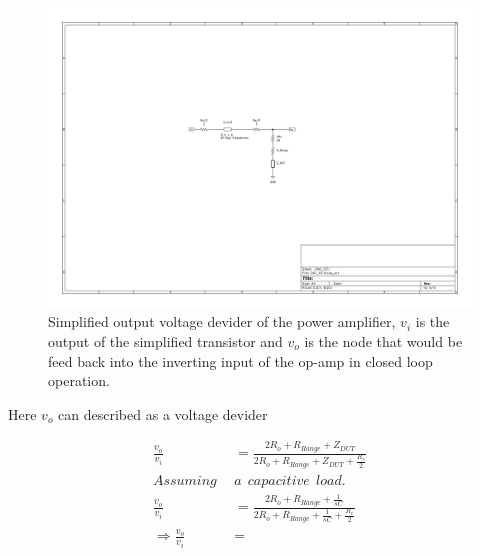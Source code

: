 \begin{figure}[H]
    \centering
    \includegraphics[clip, trim=260 240 280 220, width=1\textwidth]{Sections/7_SystemDesign/Figures/7_1_1_5_DAC_FILTER_DAC_PZ.pdf}
    \caption{Simplified output voltage devider of the power amplifier, $v_i$ is the output of the simplified transistor and $v_o$ is the node that would be feed back into the inverting input of the op-amp in closed loop operation.}
    \label{fig_7_1_1_5_DAC_PWR_AMP_PZ}
\end{figure}

Here $v_o$ can described as a voltage devider

\begin{equation}
\label{eq_DAC_PWR_1}
\begin{split}
    \frac{v_o}{v_i} &= \frac{2R_o+R_{Range}+Z_{DUT}}{2R_o+R_{Range}+Z_{DUT}+\frac{R_e}{2}} \\
    Assuming \:\: &a \:\: capacitive \:\: load. \\
    \frac{v_o}{v_i} &= \frac{2R_o+R_{Range}+\frac{1}{sC}}{2R_o+R_{Range}+\frac{1}{sC}+\frac{R_e}{2}} \\
    \Rightarrow \frac{v_o}{v_i} &= 
\end{split}
\end{equation}